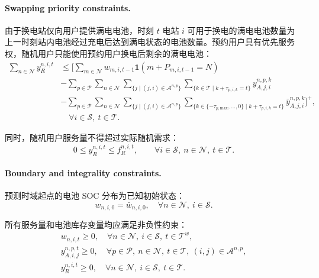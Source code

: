 \documentclass[12pt,hyperref,a4paper,UTF8]{ctexart}
\begin{document}
\paragraph{Swapping priority constraints.}
由于换电站仅向用户提供满电电池，时刻 $t$ 电站 $i$ 可用于换电的满电电池数量为上一时刻站内电池经过充电后达到满电状态的电池数量。预约用户具有优先服务权，随机用户只能使用预约用户换电后剩余的满电电池：
\begin{equation}
\begin{aligned}
\sum_{n\in \mathcal{N}} y^{n,i,t}_{R}
&\le
\biggl[
\sum_{m\in \mathcal{N}} w_{m,i,t-1}
\mathbf{1}\!\left(m+P_{m,i,t-1}=N\right) \\
&-
\sum_{p\in \mathcal{P}}
\sum_{n\in \mathcal{N}}
\sum_{\{j\mid (j,i)\in \mathcal{A}^{n,p}\}}
\sum_{\{k\in \mathcal{T}\mid k+\tau_{p,i,k}=t\}}
y^{n,p,k}_{A,j,i} \\
&-
\sum_{p\in \mathcal{P}}
\sum_{n\in \mathcal{N}}
\sum_{\{j\mid (j,i)\in \mathcal{A}^{n,p}\}}
\sum_{\{k\in \{-\tau_{p,\mathrm{max}},\ldots,0\}\mid k+\tau_{p,i,k}=t\}}
\bar{y}^{n,p,k}_{A,j,i}\biggr]^+,
\\
&\quad \forall i\in \mathcal{S},\ t\in \mathcal{T}.
\end{aligned}
\label{eq:priority}
\end{equation}

同时，随机用户服务量不得超过实际随机需求：
\begin{equation}
0\le y^{n,i,t}_{R}\le f^{n,i,t}_{R},
\qquad
\forall i\in \mathcal{S},\ n\in \mathcal{N},\ t\in \mathcal{T}.
\label{eq:random_bound}
\end{equation}

\paragraph{Boundary and integrality constraints.}
预测时域起点的电池 SOC 分布为已知初始状态：
\begin{equation}
w_{n,i,0}=\bar{w}_{n,i,0},
\quad \forall n\in \mathcal{N},\ i\in \mathcal{S}.
\label{eq:initial_inventory}
\end{equation}

所有服务量和电池库存变量均应满足非负性约束：
\begin{gather}
w_{n,i,t}\ge 0,
\quad \forall n\in \mathcal{N},\ i\in \mathcal{S},\ t\in \mathcal{T}^{w},
\label{eq:nonnegative_w}\\
y^{n,p,t}_{A,i,j}\ge 0,
\quad \forall p\in \mathcal{P},\ n\in \mathcal{N},\ t\in \mathcal{T},\ (i,j)\in \mathcal{A}^{n,p},
\label{eq:nonnegative_a}\\
y^{n,i,t}_{R}\ge 0,
\quad \forall n\in \mathcal{N},\ i\in \mathcal{S},\ t\in \mathcal{T}.
\label{eq:nonnegative_r}
\end{gather}
\end{document}
